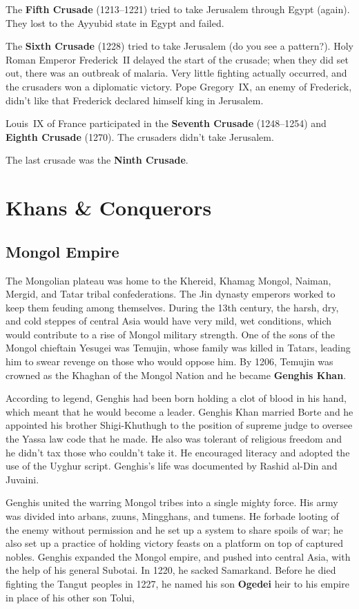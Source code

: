 The \textbf{Fifth Crusade} (1213--1221) tried to take Jerusalem through Egypt (again).
They lost to the Ayyubid state in Egypt and failed.

The \textbf{Sixth Crusade} (1228) tried to take Jerusalem (do you see a pattern?).
Holy Roman Emperor Frederick~II delayed the start of the crusade;
when they did set out, there was an outbreak of malaria.
Very little fighting actually occurred, and the crusaders won a diplomatic victory.
Pope Gregory~IX, an enemy of Frederick, didn't like that Frederick declared himself king in Jerusalem.

Louis~IX of France participated in the \textbf{Seventh Crusade} (1248--1254) and \textbf{Eighth Crusade} (1270).
The crusaders didn't take Jerusalem.

The last crusade was the \textbf{Ninth Crusade}.

\section{Khans \& Conquerors}

\subsection*{Mongol Empire}

The Mongolian plateau was home to the Khereid, Khamag Mongol, Naiman, Mergid, and Tatar tribal confederations.
The Jin dynasty emperors worked to keep them feuding among themselves.
During the 13th century, the harsh, dry, and cold steppes of central Asia would have very mild, wet conditions,
which would contribute to a rise of Mongol military strength.
One of the sons of the Mongol chieftain Yesugei was Temujin,
whose family was killed in Tatars, leading him to swear revenge on those who would oppose him.
By 1206, Temujin was crowned as the Khaghan of the Mongol Nation and he became \textbf{Genghis Khan}.

According to legend, Genghis had been born holding a clot of blood in his hand,
which meant that he would become a leader.
Genghis Khan married Borte and he appointed his brother Shigi-Khuthugh to the position of supreme judge
to oversee the Yassa law code that he made.
He also was tolerant of religious freedom and he didn't tax those who couldn't take it.
He encouraged literacy and adopted the use of the Uyghur script.
Genghis's life was documented by Rashid al-Din and Juvaini.

Genghis united the warring Mongol tribes into a single mighty force.
His army was divided into arbans, zuuns, Mingghans, and tumens.
He forbade looting of the enemy without permission and he set up a system to share spoils of war;
he also set up a practice of holding victory feasts on a platform on top of captured nobles.
Genghis expanded the Mongol empire, and pushed into central Asia, with the help of his general Subotai.
In 1220, he sacked Samarkand.
Before he died fighting the Tangut peoples in 1227,
he named his son \textbf{Ogedei} heir to his empire in place of his other son Tolui,

